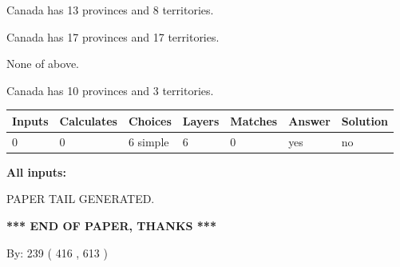 \documentclass[12pt]{article}
\begin{document}
 
Canada has  13 provinces and  8 territories.
 
 
Canada has  17 provinces and  17 territories.
 
 
 None of above.
 
 
\noindent{}
 
 
Canada has 10  provinces and 3 territories.
 
 
\noindent{}
 
 
   
   
   
   
\noindent\begin{tabular}{|l|l|l|l|l|l|l|}
 \hline
Inputs & Calculates & Choices & Layers & Matches & Answer & Solution \\ \hline
 0  & 
 0  & 
 6
  simple  
  & 
 6  & 
 0  & 
  yes & 
  no 
  \\ \hline
 \end{tabular}
   
   
   
   
\noindent{}
   
   
   
   
\noindent\vspace{0.1in}\hspace{-0.08in} {\textbf{\Large{All inputs: }}}
   
   
   
   
   
   
 \vspace{0.2in}
 
   
   
\vspace{2.0in} PAPER TAIL GENERATED.
   
   
   
   
\vspace{1.0in} 
{\textbf{\large{ *** END OF PAPER, THANKS *** }}} 
   
   
\hspace{1.0in} By: 
 239 ( 416 ,  613 )
   
   
   
   
\newpage 
\setcounter{page}{ 
   567001 } 
   
   
   
\end{document}
